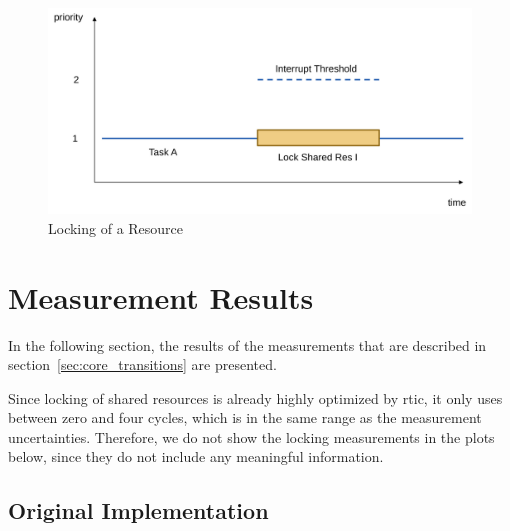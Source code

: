 \begin{figure}
  \centerfloat
  \includegraphics[width=\textwidth]{fig/locking_low_prio.svg.pdf}
  \caption{Locking of a Resource}%
  \label{fig:locking_low_prio}
\end{figure}

\section{Measurement Results}

In the following section, the results of the measurements that are described in section~\ref{sec:core_transitions} are presented.

Since locking of shared resources is already highly optimized by \gls{rtic}, it only uses between zero and four cycles, which is in the same range as the measurement uncertainties. Therefore, we do not show the locking measurements in the plots below, since they do not include any meaningful information.

\subsection{Original Implementation}




